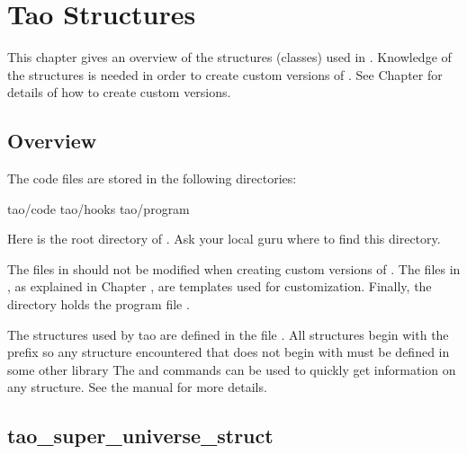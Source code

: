 \chapter{Tao Structures}
\label{c:structures}

This chapter gives an overview of the structures (classes) used in \tao.  Knowledge of the
structures is needed in order to create custom versions of \tao. See Chapter  for
details of how to create custom \tao versions.

\section{Overview}

The \tao code files are stored in the following directories:
\begin{example}
  tao/code
  tao/hooks
  tao/program
\end{example}
Here  is the root directory of \tao. Ask your local guru
where to find this directory.

The files in  should not be modified when creating custom versions of \tao. The files
in , as explained in Chapter , are templates used for
customization. Finally, the directory  holds the program file .

The structures used by tao are defined in the file .  All \tao structures begin
with the prefix  so any structure encountered that does not begin with  must be
defined in some other library The  and  commands can be used to quickly get
information on any structure. See the \bmad manual for more details.

\section{tao_super_universe_struct}
\label{s:super.uni.struct}

